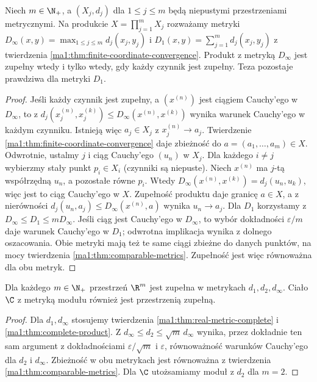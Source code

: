 \begin{twierdzenie}
\label{ma1:thm:complete-product}
Niech $m\in\N_+$, a $(X_j,d_j)$ dla $1\le j\le m$ będą niepustymi przestrzeniami metrycznymi. Na produkcie $X=\prod_{j=1}^m X_j$ rozważamy metryki $D_\infty(x,y)=\max_{1\le j\le m}d_j(x_j,y_j)$ i $D_1(x,y)=\sum_{j=1}^m d_j(x_j,y_j)$ z twierdzenia \ref{ma1:thm:finite-coordinate-convergence}. Produkt z metryką $D_\infty$ jest zupełny wtedy i tylko wtedy, gdy każdy czynnik jest zupełny. Teza pozostaje prawdziwa dla metryki $D_1$.
\end{twierdzenie}
\begin{proof}
Jeśli każdy czynnik jest zupełny, a $(x^{(n)})$ jest ciągiem Cauchy'ego w $D_\infty$, to z $d_j(x_j^{(n)},x_j^{(k)})\le D_\infty(x^{(n)},x^{(k)})$ wynika warunek Cauchy'ego w każdym czynniku. Istnieją więc $a_j\in X_j$ z $x_j^{(n)}\to a_j$. Twierdzenie \ref{ma1:thm:finite-coordinate-convergence} daje zbieżność do $a=(a_1,\ldots,a_m)\in X$.
Odwrotnie, ustalmy $j$ i ciąg Cauchy'ego $(u_n)$ w $X_j$. Dla każdego $i\ne j$ wybierzmy stały punkt $p_i\in X_i$ (czynniki są niepuste). Niech $x^{(n)}$ ma $j$-tą współrzędną $u_n$, a pozostałe równe $p_i$. Wtedy $D_\infty(x^{(n)},x^{(k)})=d_j(u_n,u_k)$, więc jest to ciąg Cauchy'ego w $X$. Zupełność produktu daje granicę $a\in X$, a z nierówności $d_j(u_n,a_j)\le D_\infty(x^{(n)},a)$ wynika $u_n\to a_j$.
Dla $D_1$ korzystamy z $D_\infty\le D_1\le m D_\infty$. Jeśli ciąg jest Cauchy'ego w $D_\infty$, to wybór dokładności $\varepsilon/m$ daje warunek Cauchy'ego w $D_1$; odwrotna implikacja wynika z dolnego oszacowania. Obie metryki mają też te same ciągi zbieżne do danych punktów, na mocy twierdzenia \ref{ma1:thm:comparable-metrics}. Zupełność jest więc równoważna dla obu metryk.
\end{proof}

\begin{wniosek}
\label{ma1:cor:euclidean-complete}
Dla każdego $m\in\N_+$ przestrzeń $\R^m$ jest zupełna w metrykach $d_1,d_2,d_\infty$. Ciało $\C$ z metryką modułu również jest przestrzenią zupełną.
\end{wniosek}
\begin{proof}
Dla $d_1,d_\infty$ stosujemy twierdzenia \ref{ma1:thm:real-metric-complete} i \ref{ma1:thm:complete-product}. Z $d_\infty\le d_2\le\sqrt m\,d_\infty$ wynika, przez dokładnie ten sam argument z dokładnościami $\varepsilon/\sqrt m$ i $\varepsilon$, równoważność warunków Cauchy'ego dla $d_2$ i $d_\infty$. Zbieżność w obu metrykach jest równoważna z twierdzenia \ref{ma1:thm:comparable-metrics}. Dla $\C$ utożsamiamy moduł z $d_2$ dla $m=2$.
\end{proof}

